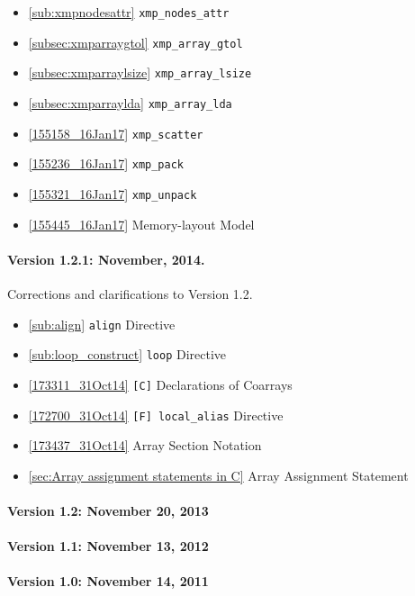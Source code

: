 \begin{itemize}
  \item \ref{sub:xmpnodesattr}         {\tt xmp\_nodes\_attr}
  \item \ref{subsec:xmparraygtol}      {\tt xmp\_array\_gtol}
  \item \ref{subsec:xmparraylsize}     {\tt xmp\_array\_lsize}
  \item \ref{subsec:xmparraylda}       {\tt xmp\_array\_lda}
  \item \ref{155158_16Jan17}           {\tt xmp\_scatter}
  \item \ref{155236_16Jan17}           {\tt xmp\_pack}
  \item \ref{155321_16Jan17}           {\tt xmp\_unpack}
  \item \ref{155445_16Jan17}           Memory-layout Model
\end{itemize}


\paragraph*{Version 1.2.1: November, 2014.} Corrections and
clarifications to Version 1.2.

\begin{itemize}
  \item \ref{sub:align} {\tt align} Directive
  \item \ref{sub:loop_construct} {\tt loop} Directive
  \item \ref{173311_31Oct14} {\tt [C]} Declarations of Coarrays
  \item \ref{172700_31Oct14} {\tt [F] local\_alias} Directive
  \item \ref{173437_31Oct14} Array Section Notation
  \item \ref{sec:Array assignment statements in C} Array Assignment Statement
\end{itemize}

\paragraph*{Version 1.2: November 20, 2013}

\paragraph*{Version 1.1: November 13, 2012}

\paragraph*{Version 1.0: November 14, 2011}
